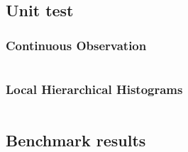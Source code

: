 \documentclass[11pt]{article}
\theoremstyle{definition}
\begin{document}
\subsection{Unit test}\label{unit_test}
\subsubsection{Continuous Observation}
\inputminted[fontsize=\footnotesize,linenos]{python}{py_files/unit_test_con_obs.py}
\subsubsection{Local Hierarchical Histograms}
\inputminted[fontsize=\footnotesize,linenos]{python}{py_files/unit_test_local_hh.py}

\subsection{Benchmark results}
\end{document}
